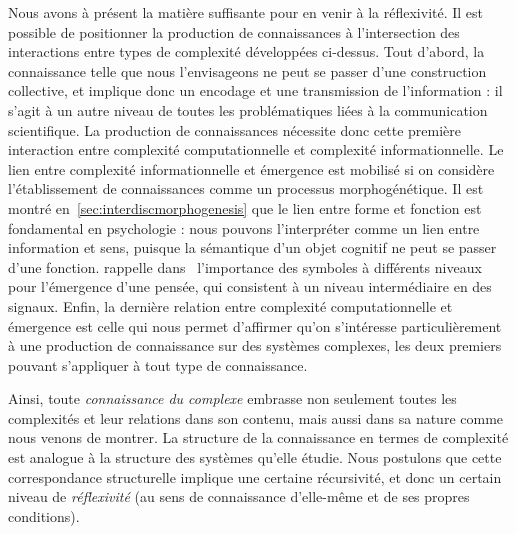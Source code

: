 Nous avons à présent la matière suffisante pour en venir à la réflexivité. Il est possible de positionner la production de connaissances à l'intersection des interactions entre types de complexité développées ci-dessus. Tout d'abord, la connaissance telle que nous l'envisageons ne peut se passer d'une construction collective, et implique donc un encodage et une transmission de l'information : il s'agit à un autre niveau de toutes les problématiques liées à la communication scientifique. La production de connaissances nécessite donc cette première interaction entre complexité computationnelle et complexité informationnelle. Le lien entre complexité informationnelle et émergence est mobilisé si on considère l'établissement de connaissances comme un processus morphogénétique. Il est montré en~\ref{sec:interdiscmorphogenesis} que le lien entre forme et fonction est fondamental en psychologie : nous pouvons l'interpréter comme un lien entre information et sens, puisque la sémantique d'un objet cognitif ne peut se passer d'une fonction.  rappelle dans~\cite{hofstadter1980godel} l'importance des symboles à différents niveaux pour l'émergence d'une pensée, qui consistent à un niveau intermédiaire en des signaux. Enfin, la dernière relation entre complexité computationnelle et émergence est celle qui nous permet d'affirmer qu'on s'intéresse particulièrement à une production de connaissance sur des systèmes complexes, les deux premiers pouvant s'appliquer à tout type de connaissance.

Ainsi, toute \emph{connaissance du complexe} embrasse non seulement toutes les complexités et leur relations dans son contenu, mais aussi dans sa nature comme nous venons de montrer. La structure de la connaissance en termes de complexité est analogue à la structure des systèmes qu'elle étudie. Nous postulons que cette correspondance structurelle implique une certaine récursivité, et donc un certain niveau de \emph{réflexivité} (au sens de connaissance d'elle-même et de ses propres conditions). 



